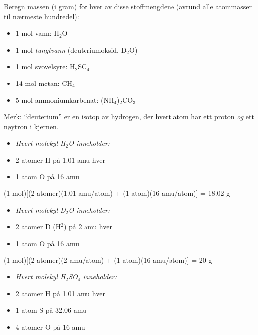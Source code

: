 

Beregn massen (i gram) for hver av disse stoffmengdene (avrund alle atommasser til nærmeste hundredel):

\begin{itemize} 
\item{} 1 mol vann: H$_{2}$O
\item{} 1 mol {\it tungtvann} (deuteriumoksid, D$_{2}$O)
\item{} 1 mol svovelsyre: H$_{2}$SO$_{4}$
\item{} 14 mol metan: CH$_{4}$
\item{} 5 mol ammoniumkarbonat: (NH$_{4}$)$_{2}$CO$_{3}$
\end{itemize} 

\vskip 10pt

Merk: ``deuterium'' er en isotop av hydrogen, der hvert atom har ett proton {\it og} ett nøytron i kjernen.







\begin{itemize} 
\item{} {\it Hvert molekyl H$_{2}$O inneholder:}
\item{} 2 atomer H på 1.01 amu hver
\item{} 1 atom O på 16 amu
\end{itemize} 

(1 mol)[(2 atomer)(1.01 amu/atom) + (1 atom)(16 amu/atom)] = 18.02 g

\vskip 10pt

\begin{itemize} 
\item{} {\it Hvert molekyl D$_{2}$O inneholder:}
\item{} 2 atomer D (H$^{2}$) på 2 amu hver
\item{} 1 atom O på 16 amu
\end{itemize} 

(1 mol)[(2 atomer)(2 amu/atom) + (1 atom)(16 amu/atom)] = 20 g

\vskip 10pt

\begin{itemize} 
\item{} {\it Hvert molekyl H$_{2}$SO$_{4}$ inneholder:}
\item{} 2 atomer H på 1.01 amu hver
\item{} 1 atom S på 32.06 amu
\item{} 4 atomer O på 16 amu
\end{itemize} 

